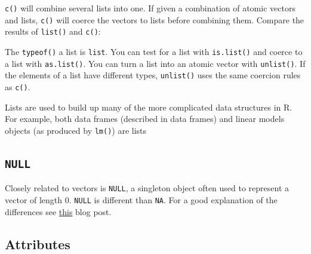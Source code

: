 \documentclass[]{book}
\newenvironment{Shaded}{\begin{snugshade}}{\end{snugshade}}
\newcommand{\KeywordTok}[1]{\textcolor[rgb]{0.13,0.29,0.53}{\textbf{#1}}}
\newcommand{\DecValTok}[1]{\textcolor[rgb]{0.00,0.00,0.81}{#1}}
\newcommand{\StringTok}[1]{\textcolor[rgb]{0.31,0.60,0.02}{#1}}
\newcommand{\CommentTok}[1]{\textcolor[rgb]{0.56,0.35,0.01}{\textit{#1}}}
\newcommand{\NormalTok}[1]{#1}
\theoremstyle{definition}
\theoremstyle{definition}
\theoremstyle{definition}
\theoremstyle{remark}
\begin{document}
\texttt{c()} will combine several lists into one. If given a combination
of atomic vectors and lists, \texttt{c()} will coerce the vectors to
lists before combining them. Compare the results of \texttt{list()} and
\texttt{c()}:

\begin{Shaded}
\end{Shaded}

The \texttt{typeof()} a list is \texttt{list}. You can test for a list
with \texttt{is.list()} and coerce to a list with \texttt{as.list()}.
You can turn a list into an atomic vector with \texttt{unlist()}. If the
elements of a list have different types, \texttt{unlist()} uses the same
coercion rules as \texttt{c()}.

Lists are used to build up many of the more complicated data structures
in R. For example, both data frames (described in data frames) and
linear models objects (as produced by \texttt{lm()}) are lists

\subsection{\texorpdfstring{\texttt{NULL}}{NULL}}\label{null}

Closely related to vectors is \texttt{NULL}, a singleton object often
used to represent a vector of length 0. \texttt{NULL} is different than
\texttt{NA}. For a good explanation of the differences see
\href{https://www.r-bloggers.com/r-na-vs-null/}{this} blog post.

\subsection{Attributes}\label{attributes}
\end{document}

